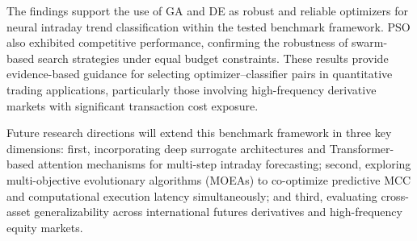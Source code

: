 The findings support the use of GA and DE as robust and reliable optimizers for neural intraday trend classification within the tested benchmark framework. PSO also exhibited competitive performance, confirming the robustness of swarm-based search strategies under equal budget constraints. These results provide evidence-based guidance for selecting optimizer--classifier pairs in quantitative trading applications, particularly those involving high-frequency derivative markets with significant transaction cost exposure.

Future research directions will extend this benchmark framework in three key dimensions: first, incorporating deep surrogate architectures and Transformer-based attention mechanisms for multi-step intraday forecasting; second, exploring multi-objective evolutionary algorithms (MOEAs) to co-optimize predictive MCC and computational execution latency simultaneously; and third, evaluating cross-asset generalizability across international futures derivatives and high-frequency equity markets.
